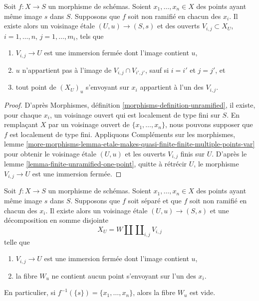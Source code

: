 \begin{lemma}
\label{lemma-unramified-etale-local}
Soit $f : X \to S$ un morphisme de schémas.
Soient $x_1, \ldots, x_n \in X$ des points ayant même image $s$ dans $S$.
Supposons que $f$ soit non ramifié en chacun des $x_i$.
Il existe alors un voisinage \'etale $(U, u) \to (S, s)$
et des ouverts $V_{i, j} \subset X_U$, $i = 1, \ldots, n$, $j = 1, \ldots, m_i$,
tels que
\begin{enumerate}
\item $V_{i, j} \to U$ est une immersion fermée dont l'image contient $u$,
\item $u$ n'appartient pas à l'image de $V_{i, j} \cap V_{i', j'}$, sauf si
$i = i'$ et $j = j'$, et
\item tout point de $(X_U)_u$ s'envoyant sur $x_i$ appartient à l'un des $V_{i, j}$.
\end{enumerate}
\end{lemma}

\begin{proof}
D'après
Morphismes, définition \ref{morphisms-definition-unramified},
il existe, pour chaque $x_i$, un voisinage ouvert qui est localement de type
fini sur $S$. En remplaçant $X$ par un voisinage ouvert de $\{x_1, \ldots, x_n\}$,
nous pouvons supposer que $f$ est localement de type fini. Appliquons
Compléments sur les morphismes, lemme
\ref{more-morphisms-lemma-etale-makes-quasi-finite-finite-multiple-points-var}
pour obtenir le voisinage \'etale $(U, u)$ et les ouverts $V_{i, j}$ finis sur
$U$. D'après
le lemme \ref{lemma-finite-unramified-one-point},
quitte à rétrécir $U$, le morphisme $V_{i, j} \to U$ est une immersion
fermée.
\end{proof}

\begin{lemma}
\label{lemma-unramified-etale-local-technical}
Soit $f : X \to S$ un morphisme de schémas.
Soient $x_1, \ldots, x_n \in X$ des points ayant même image $s$ dans $S$.
Supposons que $f$ soit séparé et que $f$ soit non ramifié en chacun des $x_i$.
Il existe alors un voisinage \'etale $(U, u) \to (S, s)$
et une décomposition en somme disjointe
$$
X_U =
W \amalg \coprod\nolimits_{i, j} V_{i, j}
$$
telle que
\begin{enumerate}
\item $V_{i, j} \to U$ est une immersion fermée dont l'image contient $u$,
\item la fibre $W_u$ ne contient aucun point s'envoyant sur l'un des $x_i$.
\end{enumerate}
En particulier, si $f^{-1}(\{s\}) = \{x_1, \ldots, x_n\}$, alors
la fibre $W_u$ est vide.
\end{lemma}

